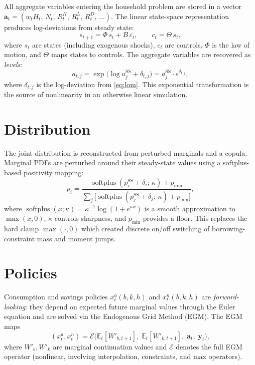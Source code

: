 \documentclass[11pt]{article}
\newcommand{\SS}{\mathrm{SS}}
\begin{document}
All aggregate variables entering the household problem are stored in a vector
$\mathbf{a}_t = (w_t H_t,\, N_t,\, R^K_t,\, R^L_t,\, R^D_t,\, \ldots)$.
The linear state-space representation produces log-deviations from steady state:
\begin{equation}\label{eq:lom}
    s_{t+1} = \Phi\, s_t + B\, \varepsilon_t, \qquad
    c_t = \Theta\, s_t,
\end{equation}
where $s_t$ are states (including exogenous shocks), $c_t$ are controls,
$\Phi$ is the law of motion, and $\Theta$ maps states to controls.
The aggregate variables are recovered as \emph{levels}:
\begin{equation}\label{eq:exp}
    a_{t,j} = \exp\!\bigl(\log a^{\SS}_j + \delta_{t,j}\bigr)
            = a^{\SS}_j \cdot e^{\delta_{t,j}},
\end{equation}
where $\delta_{t,j}$ is the log-deviation from \eqref{eq:lom}.
This exponential transformation is the source of nonlinearity in
an otherwise linear simulation.

\section{Distribution}\label{sec:distribution}

The joint distribution is reconstructed from perturbed marginals and a copula.
Marginal PDFs are perturbed around their steady-state values using
a softplus-based positivity mapping:
\begin{equation}
    \tilde{p}_i = \frac{\operatorname{softplus}(p^{\SS}_i + \delta_i;\, \kappa) + p_{\min}}
                       {\sum_j \bigl[\operatorname{softplus}(p^{\SS}_j + \delta_j;\, \kappa) + p_{\min}\bigr]},
\end{equation}
where $\operatorname{softplus}(x;\kappa) = \kappa^{-1}\log(1+e^{\kappa x})$ is a smooth
approximation to $\max(x,0)$, $\kappa$ controls sharpness, and $p_{\min}$
provides a floor. This replaces the hard clamp $\max(\cdot, 0)$ which created
discrete on/off switching of borrowing-constraint mass and moment jumps.

\section{Policies}\label{sec:policies}

Consumption and savings policies $x^a_t(b,k,h)$ and $x^n_t(b,k,h)$ are
\emph{forward-looking}: they depend on expected future marginal values through
the Euler equation and are solved via the Endogenous Grid Method (EGM).
The EGM maps
\[
    (x^a_t, x^n_t)
    = \mathcal{E}\!\bigl(\mathbb{E}_t[W'_{b,t+1}],\;
                         \mathbb{E}_t[W'_{k,t+1}],\;
                         \mathbf{a}_t,\;
                         \mathbf{y}_t\bigr),
\]
where $W'_{b}, W'_{k}$ are marginal continuation values and $\mathcal{E}$
denotes the full EGM operator (nonlinear, involving interpolation, constraints,
and max operators).
\end{document}
